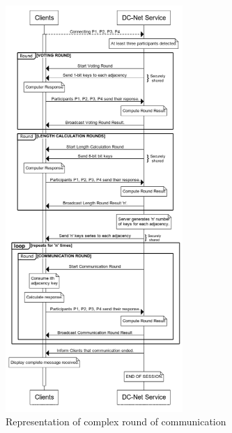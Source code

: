\begin{figure}[H]
    \centering
    \includegraphics[width=0.6\textwidth]{Images/Design/longRound.png}
    \caption{Representation of complex round of communication}
    \label{fig:longRound}
\end{figure}